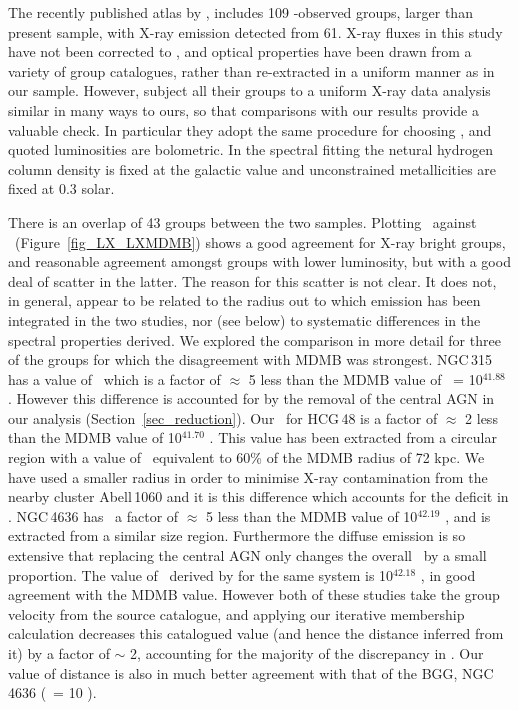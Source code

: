 \documentclass[usenatbib]{mn2e}
\begin{document}
The recently published atlas by \citet[][hereafter referred to as MDMB]{mulchaey03},
includes 109 \ROSAT-observed groups, larger than present sample, with X-ray
emission detected from 61.  X-ray fluxes in this study have not been corrected to
\rfh, and optical properties have been drawn from a variety of group catalogues,
rather than re-extracted in a uniform manner as in our sample.  However,
\citeauthor{mulchaey03} subject all their groups to a uniform X-ray data analysis
similar in many ways to ours, so that comparisons with our results provide a
valuable check.  In particular they adopt the same procedure for choosing \rcut, and
quoted luminosities are bolometric.  In the spectral fitting the netural hydrogen
column density is fixed at the galactic value and unconstrained metallicities are
fixed at 0.3 solar.

There is an overlap of 43 groups between the two samples.  Plotting \LX\ against
\LXMDMB\ (Figure~\ref{fig_LX_LXMDMB}) shows a good agreement for X-ray bright
groups, and reasonable agreement amongst groups with lower luminosity, but with
a good deal of scatter in the latter. The reason for this scatter is not clear.
It does not, in general,  appear to be related to the radius out to which
emission has been integrated in the two studies, nor (see below) to systematic
differences in the spectral properties derived. We explored the comparison in
more detail for three of the groups for which the disagreement with MDMB was
strongest.  NGC\,315 has a value of \LX\ which is a factor of $\approx$ 5 less
than the MDMB value of \LX\ = 10$^{41.88}$ \ergps.  However this difference is
accounted for by the removal of the central AGN in our analysis
(Section~\ref{sec_reduction}).  Our \LX\ for HCG\,48 is a factor of $\approx$ 2
less than the MDMB value of 10$^{41.70}$ \ergps.  This value has been extracted
from a circular region with a value of \rcut\ equivalent to 60\% of the MDMB
radius of 72 kpc.  We have used a smaller radius in order to minimise X-ray
contamination from the nearby cluster Abell\,1060 and it is this difference which
accounts for the deficit in \LX.  NGC\,4636 has \LX\ a factor of $\approx$ 5 less
than the MDMB value of 10$^{42.19}$ \ergps, and is extracted from a similar size
region.  Furthermore the diffuse emission is so extensive that replacing the
central AGN only changes the overall \LX\ by a small proportion.  The value of
\LX\ derived by \citet{helsdon00a} for the same system is 10$^{42.18}$ \ergps, in
good agreement with the MDMB value.  However both of these studies take the group
velocity from the source catalogue, and applying our iterative membership
calculation decreases this catalogued value (and hence the distance inferred from
it) by a factor of $\sim$ 2, accounting for the majority of the discrepancy in
\LX.  Our value of distance is also in much better agreement with that of the
BGG, NGC\,4636 (\D\ = 10 \Mpc).
\end{document}
